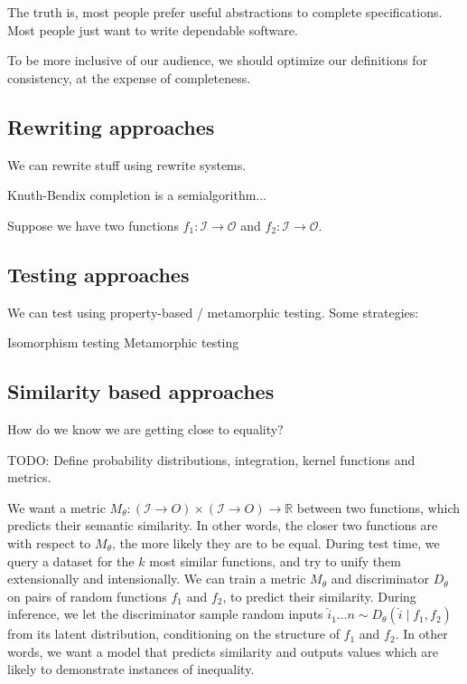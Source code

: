 \documentclass[11pt]{article}
\begin{document}
    The truth is, most people prefer useful abstractions to complete specifications. Most people just want to write dependable software.

    To be more inclusive of our audience, we should optimize our definitions for consistency, at the expense of completeness.

    \subsection{Rewriting approaches}

    We can rewrite stuff using rewrite systems.

    Knuth-Bendix completion is a semialgorithm...

    Suppose we have two functions $f_1: \mathcal{I} \rightarrow \mathcal{O}$ and $f_2: \mathcal{I}\rightarrow \mathcal{O}$.


    \subsection{Testing approaches}

    We can test using property-based / metamorphic testing. Some strategies:

    Isomorphism testing
    Metamorphic testing

    \subsection{Similarity based approaches}

    How do we know we are getting close to equality?

    TODO: Define probability distributions, integration, kernel functions and metrics.

    We want a metric $M_\theta: (\mathcal{I}\rightarrow{O}) \times (\mathcal{I}\rightarrow{O})\rightarrow \mathbb{R}$ between two functions, which predicts their semantic similarity. In other words, the closer two functions are with respect to $M_\theta$, the more likely they are to be equal. During test time, we query a dataset for the $k$ most similar functions, and try to unify them extensionally and intensionally. We can train a metric $M_\theta$ and discriminator $D_\theta$ on pairs of random functions $f_1$ and $f_2$, to predict their similarity. During inference, we let the discriminator sample random inputs $\hat i_1 \ldots n \sim D_\theta(\hat i \mid f_1, f_2)$ from its latent distribution, conditioning on the structure of $f_1$ and $f_2$. In other words, we want a model that predicts similarity and outputs values which are likely to demonstrate instances of inequality.
\end{document}
